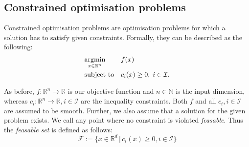 \subsection{Constrained optimisation problems}
Constrained optimisation problems are optimisation problems for which a solution has to satisfy given constraints. Formally, they can be described as the following:\\
\begin{equation}
	\label{constrained_min_problem}
	\begin{aligned}
		& \underset{x \in \mathbb{R}^n}{\operatorname*{argmin}}
		& & f(x) \\
		& \text{subject to}
		& & c_i(x) \geq 0, \; i \in \mathcal{I}.
	\end{aligned}
\end{equation}

As before, $f\colon \mathbb{R}^n\to \mathbb{R}$ is our objective function and $n \in \mathbb{N}$ is the input dimension, whereas $c_i\colon \mathbb{R}^n\to \mathbb{R}, i \in \mathcal{I}$ are the inequality constraints. Both $f$ and all $c_i, i \in \mathcal{I}$ are assumed to be smooth. Further, we also assume that a solution for the given problem exists. We call any point where no constraint is violated \textit{feasable}. Thus the \textit{feasable set} is defined as follows:
\[ \mathcal{F} := \{x \in \mathbb{R}^d \,|\, c_i(x) \geq 0, i\in \mathcal{I} \} \]

